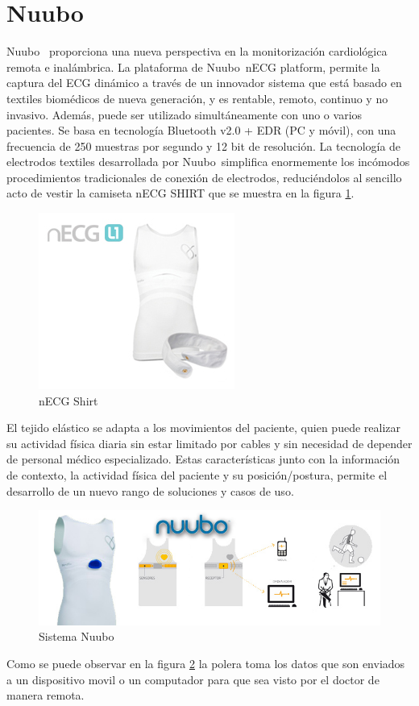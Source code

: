 \section{Nuubo\textregistered}

Nuubo\textregistered\ \cite{nuubo} proporciona una nueva perspectiva en la monitorización cardiológica remota e inalámbrica. La plataforma de Nuubo\textregistered\, nECG platform, permite la captura del ECG dinámico a través de un innovador sistema que está basado en textiles biomédicos de nueva generación, y es rentable, remoto, continuo y no invasivo. Además, puede ser utilizado simultáneamente con uno o varios pacientes. Se basa en tecnología Bluetooth v2.0 + EDR (PC y móvil), con una frecuencia de 250 muestras por segundo y 12 bit de resolución\cite{nuubo_tel}.
La tecnología de electrodos textiles desarrollada por Nuubo\textregistered\ simplifica enormemente los incómodos procedimientos tradicionales de conexión de electrodos, reduciéndolos al sencillo acto de vestir la camiseta nECG SHIRT que se muestra en la figura \ref{shirt}.

\begin{figure}[H]
	\centering
	\includegraphics[scale=0.6]{figuras/estadoarte/nuubo/shirt.png}
	\caption{nECG Shirt}
	\label{shirt}
\end{figure}

El tejido elástico se adapta a los movimientos del paciente, quien puede realizar su actividad física diaria sin estar limitado por cables y sin necesidad de depender de personal médico especializado. Estas características junto con la información de contexto, la actividad física del paciente y su posición/postura, permite el desarrollo de un nuevo rango de soluciones y casos de uso. 

\begin{figure}[H]
	\centering
	\includegraphics[scale=0.7]{figuras/estadoarte/nuubo/nuubo.png}
	\caption{Sistema Nuubo}
	\label{nuubo}
\end{figure}

Como se puede observar en la figura \ref{nuubo} la polera toma los datos que son enviados a un dispositivo movil o un computador para que sea visto por el doctor de manera remota.